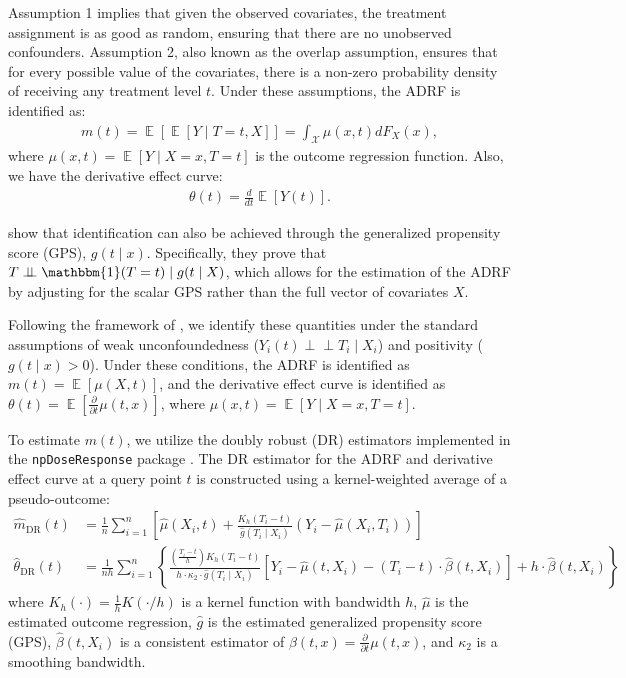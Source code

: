 \documentclass[12pt]{article}
\newcommand{\ind}{\perp\!\!\!\perp}
\DeclareMathOperator{\E}{\mathbb{E}}
\theoremstyle{definition}
\begin{document}
Assumption 1 implies that given the observed covariates, the treatment assignment is as good as random, ensuring that there are no unobserved confounders. Assumption 2, also known as the overlap assumption, ensures that for every possible value of the covariates, there is a non-zero probability density of receiving any treatment level $t$. Under these assumptions, the ADRF is identified as:
\begin{align*}
    m(t) = \E[ \E[Y \mid T=t, X] ] = \int_{\mathcal{X}} \mu(x, t) dF_X(x),
\end{align*}
where $\mu(x, t) = \E[Y \mid X=x, T=t]$ is the outcome regression function. Also, we have the derivative effect curve:
\begin{align*}
  \theta(t) = \frac{d}{dt} \E \left[ Y(t) \right].
\end{align*}

\citet{hirano2004propensity} show that identification can also be achieved through the generalized propensity score (GPS), $g(t \mid x)$. Specifically, they prove that $T \ind \mathbbm{1}(T=t) \mid g(t \mid X)$, which allows for the estimation of the ADRF by adjusting for the scalar GPS rather than the full vector of covariates $X$.

Following the framework of \citet{Zhang2025a}, we identify these quantities under the standard assumptions of weak unconfoundedness ($Y_i(t) \ind T_i \mid X_i$) and positivity ($g(t \mid x) > 0$). Under these conditions, the ADRF is identified as $m(t) = \E[\mu(X, t)]$, and the derivative effect curve is identified as $\theta(t) = \E \left[ \frac{\partial}{\partial t} \mu(t, x) \right]$, where $\mu(x, t) = \E[Y \mid X=x, T=t]$. 

To estimate $m(t)$, we utilize the doubly robust (DR) estimators implemented in the \texttt{npDoseResponse} package \citep{Zhang2025b, Zhang2025a}. The DR estimator for the ADRF and derivative effect curve at a query point $t$ is constructed using a kernel-weighted average of a pseudo-outcome:
\begin{align*}
  \widehat{m}_{\text{DR}}(t) &= \frac{1}{n} \sum_{i=1}^n \left[ \widehat{\mu}(X_i, t) + \frac{K_h(T_i - t)}{\widehat{g}(T_i \mid X_i)} (Y_i - \widehat{\mu}(X_i, T_i)) \right]\\ 
  \widehat{\theta}_{\text{DR}}(t) &= \frac{1}{nh} \sum_{i = 1}^{n} \left\{ \frac{\left( \frac{T_i - t}{h} \right) K_h \left( T_i - t \right)}{h \cdot \kappa_2 \cdot \hat{g}(T_i \mid X_i) } \left[ Y_i - \hat{\mu}(t, X_i) - (T_i - t) \cdot \hat{\beta}(t, X_i) \right] + h \cdot \hat{\beta}(t, X_i) \right\}
\end{align*}
where $K_h(\cdot) = \frac{1}{h}K(\cdot/h)$ is a kernel function with bandwidth $h$, $\widehat{\mu}$ is the estimated outcome regression, $\widehat{g}$ is the estimated generalized propensity score (GPS), $\hat{\beta}(t, X_i)$ is a consistent estimator of $\beta(t, x) = \frac{\partial}{\partial t} \mu(t, x)$, and $\kappa_2$ is a smoothing bandwidth.
\end{document}
